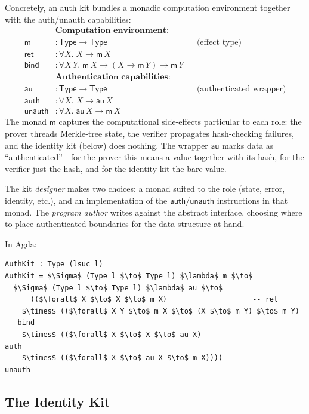 \documentclass[acmsmall,screen,review,anonymous]{acmart}
\begin{document}
Concretely, an auth kit bundles a monadic computation environment
together with the auth/unauth capabilities:
%
\begin{align*}
  &\textbf{Computation environment:} \\
  \mathsf{m}       &: \mathsf{Type} \to \mathsf{Type}
    && \text{(effect type)} \\
  \mathsf{ret}     &: \forall X.\; X \to \mathsf{m}\,X \\
  \mathsf{bind}    &: \forall X\,Y.\; \mathsf{m}\,X \to
                      (X \to \mathsf{m}\,Y) \to \mathsf{m}\,Y \\[4pt]
  &\textbf{Authentication capabilities:} \\
  \mathsf{au}      &: \mathsf{Type} \to \mathsf{Type}
    && \text{(authenticated wrapper)} \\
  \mathsf{auth}    &: \forall X.\; X \to \mathsf{au}\,X \\
  \mathsf{unauth}  &: \forall X.\; \mathsf{au}\,X \to \mathsf{m}\,X
\end{align*}
%
The monad $\mathsf{m}$ captures the computational side-effects
particular to each role: the prover threads Merkle-tree state, the
verifier propagates hash-checking failures, and the identity kit (below)
does nothing.  The wrapper $\mathsf{au}$ marks data as
``authenticated''---for the prover this means a value together with its
hash, for the verifier just the hash, and for the identity kit the bare
value.

The kit \emph{designer} makes two choices: a monad suited to the
role (state, error, identity, etc.), and an implementation of the
$\mathsf{auth}$/$\mathsf{unauth}$ instructions in that monad.  The
\emph{program author} writes against the abstract interface, choosing
where to place authenticated boundaries for the data structure at hand.

In Agda:
%
\begin{lstlisting}
AuthKit : Type (lsuc l)
AuthKit = $\Sigma$ (Type l $\to$ Type l) $\lambda$ m $\to$
  $\Sigma$ (Type l $\to$ Type l) $\lambda$ au $\to$
      (($\forall$ X $\to$ X $\to$ m X)                    -- ret
    $\times$ (($\forall$ X Y $\to$ m X $\to$ (X $\to$ m Y) $\to$ m Y)  -- bind
    $\times$ (($\forall$ X $\to$ X $\to$ au X)                  -- auth
    $\times$ (($\forall$ X $\to$ au X $\to$ m X))))              -- unauth
\end{lstlisting}

\subsection{The Identity Kit}
\end{document}
